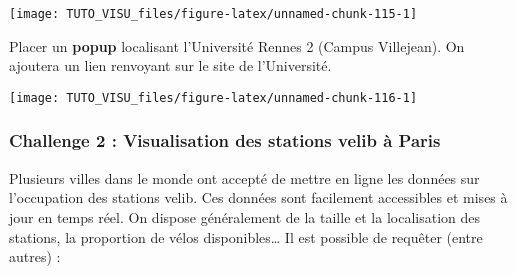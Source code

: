 \documentclass[]{article}
\newenvironment{Shaded}{\begin{snugshade}}{\end{snugshade}}
\newcommand{\DataTypeTok}[1]{\textcolor[rgb]{0.13,0.29,0.53}{#1}}
\newcommand{\DecValTok}[1]{\textcolor[rgb]{0.00,0.00,0.81}{#1}}
\newcommand{\ErrorTok}[1]{\textcolor[rgb]{0.64,0.00,0.00}{\textbf{#1}}}
\newcommand{\KeywordTok}[1]{\textcolor[rgb]{0.13,0.29,0.53}{\textbf{#1}}}
\newcommand{\NormalTok}[1]{#1}
\newcommand{\OperatorTok}[1]{\textcolor[rgb]{0.81,0.36,0.00}{\textbf{#1}}}
\newcommand{\OtherTok}[1]{\textcolor[rgb]{0.56,0.35,0.01}{#1}}
\newcommand{\StringTok}[1]{\textcolor[rgb]{0.31,0.60,0.02}{#1}}
\theoremstyle{definition}
\theoremstyle{definition}
\theoremstyle{definition}
\theoremstyle{remark}
\let\BeginKnitrBlock\begin \let\EndKnitrBlock\end
\begin{document}
\begin{center}\texttt{[image: TUTO\_VISU\_files/figure-latex/unnamed-chunk-115-1]} \end{center}

\BeginKnitrBlock{exercise}[Popup avec leaflet]
\protect\hypertarget{exr:exo-carto-popup-leaflet}{}{\label{exr:exo-carto-popup-leaflet} \iffalse (Popup avec leaflet) \fi{} }
\EndKnitrBlock{exercise}

Placer un \textbf{popup} localisant l'Université Rennes 2 (Campus Villejean). On ajoutera un lien renvoyant sur le site de l'Université.

\begin{Shaded}
\end{Shaded}

\begin{center}\texttt{[image: TUTO\_VISU\_files/figure-latex/unnamed-chunk-116-1]} \end{center}

\hypertarget{challenge-2-visualisation-des-stations-velib-uxe0-paris}{%
\subsubsection{Challenge 2 : Visualisation des stations velib à Paris}\label{challenge-2-visualisation-des-stations-velib-uxe0-paris}}

Plusieurs villes dans le monde ont accepté de mettre en ligne les données sur l'occupation des stations velib. Ces données sont facilement accessibles et mises à jour en temps réel. On dispose généralement de la taille et la localisation des stations, la proportion de vélos disponibles\ldots{}
Il est possible de requêter (entre autres) :
\end{document}
